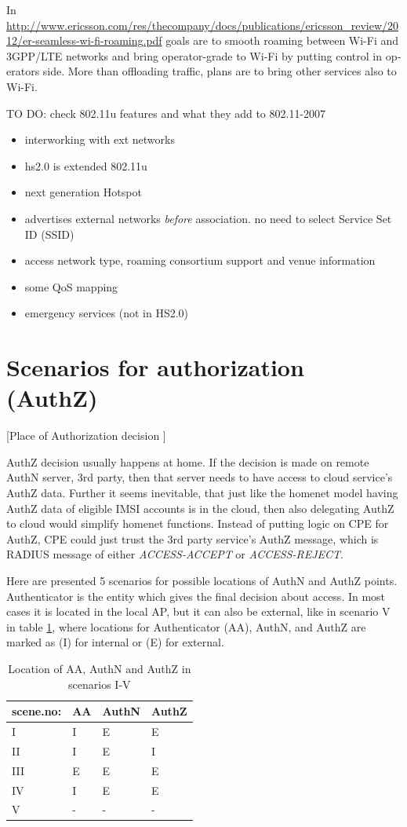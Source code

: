 \documentclass[12pt,a4paper,english]{tutthesis}
\begin{document}
\begin{otherlanguage}{english}
In 
\url{http://www.ericsson.com/res/thecompany/docs/publications/ericsson_review/2012/er-seamless-wi-fi-roaming.pdf}
goals are to smooth roaming between Wi-Fi and 3GPP/LTE networks
and bring operator-grade to Wi-Fi by putting control in operators side. More
than offloading traffic, plans are to bring other services also to Wi-Fi.

TO DO: check 802.11u features and what they add to 802.11-2007
\begin{itemize}
\item interworking with ext networks
\item hs2.0 is extended 802.11u
\item next generation Hotspot
\item advertises external networks \emph{before} association. no need to
select Service Set ID (SSID)
\item access network type, roaming consortium support and venue information
\item some QoS mapping
\item emergency services (not in HS2.0)
\end{itemize}


\section{Scenarios for authorization (AuthZ)}
\label{sec-4-5}

[Place of Authorization decision  ]

AuthZ decision usually happens at home.
If the decision is made on remote AuthN server, 3rd party, 
then that server needs to have access to 
cloud service's AuthZ data. 
Further it seems inevitable, that just like the homenet model
having AuthZ data of eligible IMSI accounts is in the cloud, 
then also delegating AuthZ to cloud would simplify homenet
functions. Instead of putting logic on CPE for AuthZ, CPE
could just trust the 3rd party service's AuthZ message, which is 
RADIUS message of either \emph{ACCESS-ACCEPT} or \emph{ACCESS-REJECT}.


Here are presented 5 scenarios for possible locations of AuthN and 
AuthZ points. Authenticator is the entity which gives the final decision 
about access. In most cases it is located in the
local AP, but it can also be external, like in scenario V in 
table \ref{table-scenarios}, where locations for Authenticator (AA),
AuthN, and AuthZ are marked as (I) for internal or (E) for external.

\begin{table}[htb]
\caption{\label{table-scenarios}Location of AA, AuthN and AuthZ in scenarios I-V}
\centering
\begin{tabular}{llll}
scene.no: & AA & AuthN & AuthZ\\
\hline
I & I & E & E\\
II & I & E & I\\
III & E & E & E\\
IV & I & E & E\footnotemark\\
V & - & - & -\\
\end{tabular}
\end{table}



\end{otherlanguage}
\end{document}
